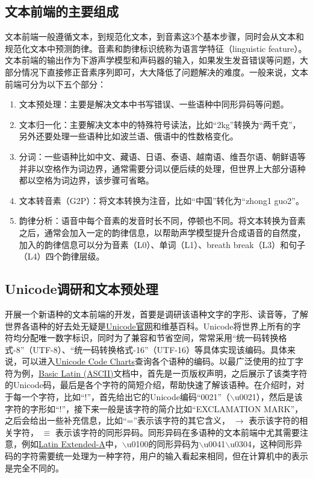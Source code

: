 \documentclass[cn,10pt,math=newtx,citestyle=gb7714-2015,bibstyle=gb7714-2015]{elegantbook}
\begin{document}
\subsection{文本前端的主要组成}

文本前端一般遵循文本，到规范化文本，到音素这3个基本步骤，同时会从文本和规范化文本中预测韵律。音素和韵律标识统称为语言学特征（linguistic feature）。文本前端的输出作为下游声学模型和声码器的输入，如果发生发音错误等问题，大部分情况下直接修正音素序列即可，大大降低了问题解决的难度。一般来说，文本前端可分为以下五个部分：

\begin{enumerate}
  \item 文本预处理：主要是解决文本中书写错误、一些语种中同形异码等问题。
  \item 文本归一化：主要解决文本中的特殊符号读法，比如“2kg”转换为“两千克”，另外还要处理一些语种比如波兰语、俄语中的性数格变化。
  \item 分词：一些语种比如中文、藏语、日语、泰语、越南语、维吾尔语、朝鲜语等并非以空格作为词边界，通常需要分词以便后续的处理，但世界上大部分语种都以空格为词边界，该步骤可省略。
  \item 文本转音素（G2P）：将文本转换为注音，比如“中国”转化为“zhong1 guo2”。
  \item 韵律分析：语音中每个音素的发音时长不同，停顿也不同。将文本转换为音素之后，通常会加入一定的韵律信息，以帮助声学模型提升合成语音的自然度，加入的韵律信息可以分为音素（L0）、单词（L1）、breath break（L3）和句子（L4）四个韵律层级。
\end{enumerate}

\subsection{Unicode调研和文本预处理}

开展一个新语种的文本前端的开发，首要是调研该语种文字的字形、读音等，了解世界各语种的好去处无疑是\href{https://unicode.org/main.html}{Unicode官网}和维基百科。Unicode将世界上所有的字符均分配唯一数字标识，同时为了兼容和节省空间，常常采用“统一码转换格式-8”（UTF-8）、“统一码转换格式-16”（UTF-16）等具体实现该编码。具体来说，可以进入\href{https://www.unicode.org/charts/}{Unicode Code Charts}查询各个语种的编码。以最广泛使用的拉丁字符为例，\href{https://www.unicode.org/charts/PDF/U0000.pdf}{Basic Latin (ASCII)}文档中，首先是一页版权声明，之后展示了该类字符的Unicode码，最后是各个字符的简短介绍，帮助快速了解该语种。在介绍时，对于每一个字符，比如“!”，首先给出它的Unicode编码“0021”（$\backslash$u0021），然后是该字符的字形如“!”，接下来一般是该字符的简介比如“EXCLAMATION MARK”，之后会给出一些补充信息，比如“=”表示该字符的其它含义， $\to$ 表示该字符的相关字符， $\equiv$ 表示该字符的同形异码。同形异码在多语种的文本前端中尤其需要注意，例如\href{https://www.unicode.org/charts/PDF/U0100.pdf}{Latin Extended-A}中，$\backslash$u0100的同形异码为$\backslash$u0041$\backslash$u0304，这种同形异码的字符需要统一处理为一种字符，用户的输入看起来相同，但在计算机中的表示是完全不同的。
\end{document}
